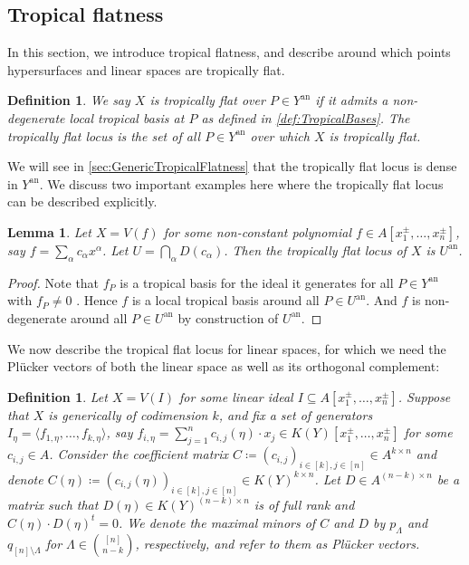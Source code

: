 \documentclass[12pt,reqno,a4paper]{amsart}
\theoremstyle{theoremstyle}
\newtheorem{lemma}[theorem]{Lemma}
\theoremstyle{examplestyle}
\newtheorem{definition}[theorem]{Definition}
\theoremstyle{algorithmstyle}
\newcommand{\an}{{\mathrm{an}}}
\begin{document}
\subsection{Tropical flatness}\label{sec:tropicalFlatnessBasics}
In this section, we introduce tropical flatness, and describe around which points hypersurfaces and linear spaces are tropically flat.

\begin{definition}
  \label{def:TropicallyFlat}
  We say $X$ is \emph{tropically flat} over $P\in{Y^{\mathrm{an}}}$ if it admits a non-degenerate local tropical basis at $P$ as defined in \cref{def:TropicalBases}. The \emph{tropically flat locus} is the set of all $P\in{Y^{\mathrm{an}}}$ over which $X$ is tropically flat.
\end{definition}

We will see in \cref{sec:GenericTropicalFlatness} that the tropically flat locus is dense in $Y^{\an}$. We discuss two important examples here where the tropically flat locus can be described explicitly.  %

%

\begin{lemma}\label{cor:TropConstant}
  Let $X=V(f)$ for some non-constant polynomial $f\in A[x_{1}^{\pm},\dots,x_{n}^{\pm}]$, say $f=\sum_\alpha c_{\alpha}x^{\alpha}$. Let $U=\bigcap_\alpha D(c_{\alpha})$.  Then the tropically flat locus of $X$ is $U^{\an}$.
\end{lemma}
\begin{proof}
  Note that $f_P$ is a tropical basis for the ideal it generates for all $P\in Y^{\an}$ with $f_P\neq 0$ \cite[Example 2.6.4]{MS15}.  Hence $f$ is a local tropical basis around all $P\in U^{\an}$. And $f$ is non-degenerate around all $P\in U^{\an}$ by construction of $U^\an$.
\end{proof}

We now describe the tropical flat locus for linear spaces, for which we need the Pl\"ucker vectors of both the linear space as well as its orthogonal complement:

\begin{definition}\label{def:PlueckerVectors}
  Let $X=V(I)$ for some linear ideal $I\subseteq A[x_{1}^{\pm},\dots,x_{n}^{\pm}]$. Suppose that $X$ is generically of codimension $k$, and fix a set of generators $I_{\eta} = \langle f_{1,\eta},\dots,f_{k,\eta}\rangle$, say $f_{i,\eta}=\sum_{j=1}^n c_{i,j}(\eta)\cdot x_j\in K(Y)[x_{1}^{\pm},\dots,x_{n}^{\pm}]$ for some $c_{i,j}\in A$.
  Consider the coefficient matrix $C\coloneqq (c_{i,j})_{i\in[k],j\in[n]}\in A^{k\times n}$ and denote $C(\eta)\coloneqq (c_{i,j}(\eta))_{i\in[k],j\in[n]}\in K(Y)^{k\times n}$.  Let $D\in A^{(n-k)\times n}$ be a matrix such that $D(\eta)\in K(Y)^{(n-k)\times n}$ is of full rank and $C(\eta)\cdot D(\eta)^t=0$.  We denote the maximal minors of $C$ and $D$ by $p_{\Lambda}$ and $q_{[n]\setminus\Lambda}$ for $\Lambda\in\binom{[n]}{n-k}$, respectively, and refer to them as \emph{Pl\"ucker vectors}.
\end{definition}
\end{document}

